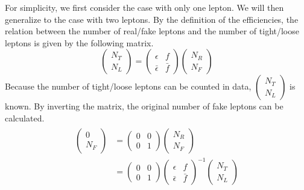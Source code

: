 For simplicity, we first consider the case with only one lepton. We will then generalize to the case with two leptons.
By the definition of the efficiencies, the relation between the number of real/fake leptons and the number of tight/loose leptons is given by the following matrix.
\begin{equation}
\left( \begin{array}{c}
N_T \\
N_L
\end{array} \right)
=
\left( \begin{array}{cc}
\epsilon & f \\
\bar{\epsilon} & \bar{f}
\end{array} \right)
\left( \begin{array}{c}
N_R \\
N_F
\end{array} \right)
\label{equ:fake_eff_def}
\end{equation}
Because the number of tight/loose leptons can be counted in data, $\left( \begin{array}{c}
N_T \\
N_L
\end{array} \right)$ is known.
By inverting the matrix, the original number of fake leptons can be calculated.
\begin{align}
\begin{split}
\left( \begin{array}{c}
0 \\
N_F
\end{array} \right)
&=
\left( \begin{array}{cc}
0 & 0 \\
0 & 1
\end{array} \right)
\left( \begin{array}{c}
N_R \\
N_F
\end{array} \right) \\
&=
\left( \begin{array}{cc}
0 & 0 \\
0 & 1
\end{array} \right)
\left( \begin{array}{cc}
\epsilon & f \\
\bar{\epsilon} & \bar{f}
\end{array} \right)^{-1}
\left( \begin{array}{c}
N_T \\
N_L
\end{array} \right)
\end{split}
\end{align}
